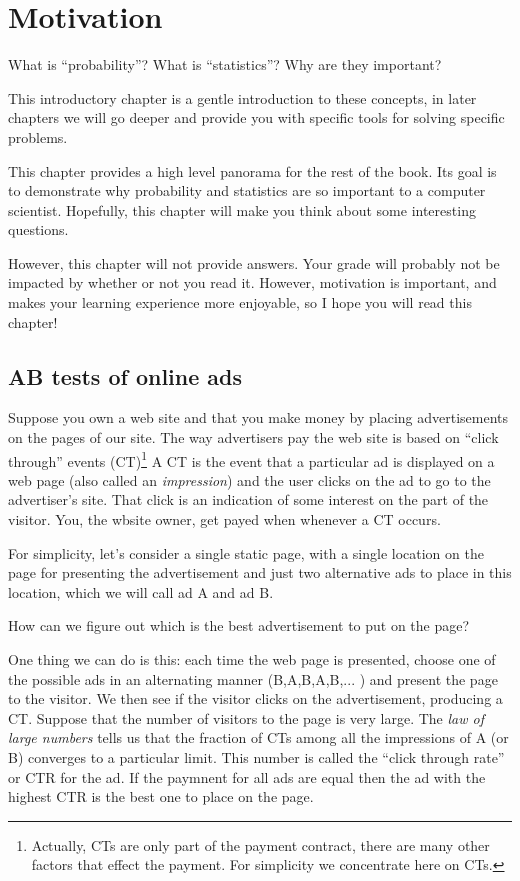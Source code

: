 \chapter{Motivation}

What is ``probability''? What is ``statistics''? Why are they
important?

This introductory chapter is a gentle introduction to these concepts,
in later chapters we will go deeper and provide you with specific
tools for solving specific problems.

This chapter provides a high level panorama for the rest of the
book. Its goal is to demonstrate why probability and statistics are so
important to a computer scientist. Hopefully, this chapter will make
you think about some interesting questions.

However, this chapter will not provide answers. Your grade will
probably not be impacted by whether or not you read it. However,
motivation is important, and makes your learning experience more
enjoyable, so I hope you will read this chapter!

\section{AB tests of online ads}

Suppose you own a web site and that you make money by placing
advertisements on the pages of our site. The way advertisers pay the web
site is based on ``click through'' events (CT)\footnote{Actually, CTs are
  only part of the payment contract, there are many other factors that effect
  the payment. For simplicity we concentrate here on CTs.} 
A CT is the event that a particular ad is displayed on a
web page (also called an {\em impression}) and the user clicks on the
ad to go to the advertiser's site. That click is an indication of some
interest on the part of the visitor. You, the wbsite owner, get
payed when whenever a CT occurs.

For simplicity, let's consider a single static page, with a single
location on the page for presenting the advertisement and just two
alternative ads to place in this location, which we will call ad A and
ad B. 

How can we figure out which is the best advertisement to put on the
page?

One thing we can do is this: each time the web page is presented,
choose one of the possible ads in an alternating manner
(B,A,B,A,B,... ) and present the page to the visitor. We then see if
the visitor clicks on the advertisement, producing a CT. Suppose that
the number of visitors to the page is very large. The {\em law of
  large numbers} tells us that the fraction of CTs among all the
impressions of A (or B) converges to a particular limit.  This number
is called the ``click through rate'' or CTR for the ad. If the
paymnent for all ads are equal then the ad with the highest CTR is the
best one to place on the page.

